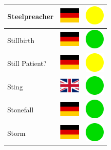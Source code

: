 \documentclass[12pt, a4paper, twoside]{report}
\begin{document}
\begin{center}
\begin{longtable}{|p{5cm}|p{2cm}|p{2cm}|}
 Steelpreacher                                              & \includegraphics[width=1cm]{../img/flags/de} &   \includegraphics[width=1cm]{../likes/m} \\ \hline
 Stillbirth                                                 & \includegraphics[width=1cm]{../img/flags/de} &   \includegraphics[width=1cm]{../likes/y} \\ \hline
 Still Patient?                                             & \includegraphics[width=1cm]{../img/flags/de} &   \includegraphics[width=1cm]{../likes/m} \\ \hline
 Sting                                                      & \includegraphics[width=1cm]{../img/flags/gb} &   \includegraphics[width=1cm]{../likes/y} \\ \hline
 Stonefall                                                  & \includegraphics[width=1cm]{../img/flags/de} &   \includegraphics[width=1cm]{../likes/y} \\ \hline
 Storm                                                      & \includegraphics[width=1cm]{../img/flags/de} &   \includegraphics[width=1cm]{../likes/y} \\ \hline

\end{longtable}
\end{center}
\end{document}
